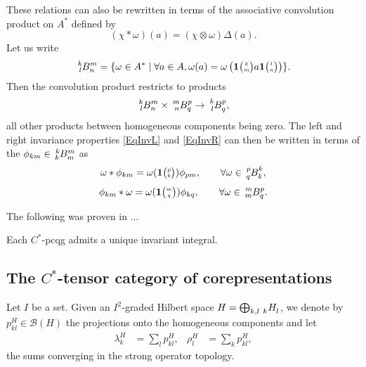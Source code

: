 These relations can also  be rewritten in terms of the associative
convolution product on $A^*$  defined by \[(\chi*\omega)(a) =
(\chi\otimes \omega)\Delta(a).\] Let us write \begin{equation}\label{DefSpB} \Gr{B}{k}{m}{l}{n} = \{\omega \in A^* \mid \forall a\in A, \omega(a) = \omega\left(\UnitC{k}{m}a\UnitC{l}{n}\right)\}.\end{equation}Then the convolution product restricts to products \[\Gr{B}{k}{m}{l}{n}\times \Gr{B}{m}{p}{n}{q}\rightarrow \Gr{B}{k}{p}{l}{q},\] all other products between homogeneous components being zero. The left and right invariance properties \eqref{EqInvL} and \eqref{EqInvR} can then be written in terms of the $\phi_{km}\in \Gr{B}{k}{m}{k}{m}$ as \begin{equation}\label{EqInvLp}\omega*\phi_{km} = \omega(\UnitC{p}{k})\phi_{pm},\qquad \forall \omega \in \Gr{B}{p}{k}{q}{k},\end{equation}
\begin{equation}\label{EqInvRp}\phi_{km}*\omega = \omega(\UnitC{m}{q})\phi_{kq},\qquad \forall \omega \in \Gr{B}{m}{p}{m}{q}.\end{equation}



The following was proven in ...

\begin{Theorem}\label{TheoInvInt} Each $C^*$-pcqg admits a unique invariant integral.
\end{Theorem} 


\subsection{The $C^{*}$-tensor category of corepresentations}

Let $I$ be a set. Given an $I^{2}$-graded Hilbert space
$H=\bigoplus_{k,l} \Grd{H}{k}{l}$, we denote by
$p_{kl}^{H} \in \mathcal{B}(H)$ the projections onto the homogeneous components and let
\begin{align*}
  \lambda^{H}_{k} &= \sum_{l} p_{kl}^{H}, &
  \rho^{H}_{l} &= \sum_{k} p_{kl}^{H},
\end{align*}
 the sums converging in the strong operator topology.


